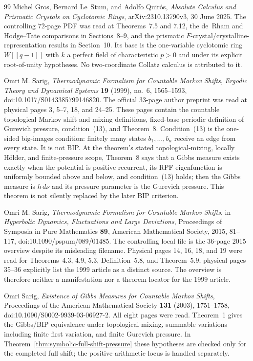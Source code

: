 \begin{thebibliography}{99}
Michel Gros, Bernard Le~Stum, and Adolfo Quir\'os,
\emph{Absolute Calculus and Prismatic Crystals on Cyclotomic Rings},
arXiv:2310.13790v3, 30 June 2025.
The controlling 72-page PDF was read at Theorems~7.5 and 7.12, the de~Rham
and Hodge--Tate comparisons in Sections~8--9, and the prismatic
$F$-crystal/crystalline-representation results in Section~10.  Its base is
the one-variable cyclotomic ring $W[[q-1]]$ with $k$ a perfect field of
characteristic $p>0$ and under its explicit root-of-unity hypotheses.  No two-coordinate Collatz calculus is
attributed to it.

Omri M. Sarig,
\emph{Thermodynamic Formalism for Countable Markov Shifts},
\emph{Ergodic Theory and Dynamical Systems} \textbf{19} (1999), no.~6,
1565--1593, doi:10.1017/S0143385799146820.
The official 33-page author preprint was read at physical pages 3, 5--7, 18,
and 24--25.  These pages contain the countable topological Markov shift and
mixing definitions, fixed-base periodic definition of Gurevich pressure,
condition~(13), and Theorem~8.  Condition~(13) is the one-sided big-images
condition: finitely many states $b_1,\ldots,b_n$ receive an edge from every
state.  It is not BIP.  At the theorem's stated topological-mixing, locally
H\"older, and finite-pressure scope, Theorem~8 says that a Gibbs measure
exists exactly when the potential is positive recurrent, its RPF
eigenfunction is uniformly bounded above and below, and condition~(13)
holds; then the Gibbs measure is $h\,d\nu$ and its pressure parameter is the
Gurevich pressure.  This theorem is not silently replaced by the later BIP
criterion.

Omri M. Sarig,
\emph{Thermodynamic Formalism for Countable Markov Shifts}, in
\emph{Hyperbolic Dynamics, Fluctuations and Large Deviations},
Proceedings of Symposia in Pure Mathematics \textbf{89}, American
Mathematical Society, 2015, 81--117,
doi:10.1090/pspum/089/01485.
The controlling local file is the 36-page 2015 overview despite its
misleading filename.  Physical pages 14, 16, 18, and 19 were read for
Theorems~4.3, 4.9, 5.3, Definition~5.8, and Theorem~5.9; physical pages
35--36 explicitly list the 1999 article as a distinct source.  The overview
is therefore neither a manifestation nor a theorem locator for the 1999
article.

Omri Sarig,
\emph{Existence of Gibbs Measures for Countable Markov Shifts},
Proceedings of the American Mathematical Society \textbf{131} (2003),
1751--1758, doi:10.1090/S0002-9939-03-06927-2.
All eight pages were read.  Theorem~1 gives the Gibbs/BIP equivalence under
topological mixing, summable variations including finite first variation,
and finite Gurevich pressure.  In
Theorem~\ref{thm:symbolic-full-shift-pressure} these hypotheses are checked
only for the completed full shift; the positive arithmetic locus is handled
separately.


\end{thebibliography}
